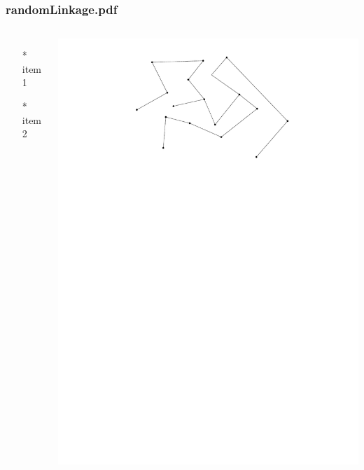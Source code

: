 \begin{frame} \frametitle{randomLinkage.pdf}
    \begin{columns}[c]
        \begin{itemize}
            \item[*] item 1
            \item[*] item 2
        \end{itemize}
        \begin{minipage}{\linewidth}
            \begin{center}
            \includegraphics[width=.9\textwidth]{graphics/randomLinkage.pdf}
            \label{gfx:randomLinkage.pdf}
            \end{center}
        \end{minipage}
    \end{columns}
\end{frame}
